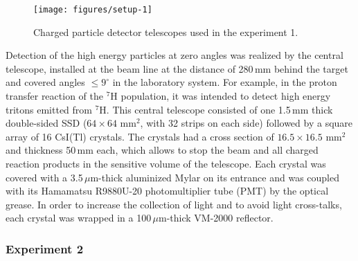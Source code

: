 \begin{figure}
	\begin{center}
		\texttt{[image: figures/setup-1]}
	\end{center}
	\caption{Charged particle detector telescopes used in the experiment 1.}
	\label{fig:setup-1}
\end{figure}

Detection of the high energy particles at zero angles was realized by the central telescope, installed at the beam line at the distance of 280\,mm behind the target and covered angles $\leq9^{\circ}$ in the laboratory system.
For example, in the proton transfer reaction of the $^7$H population, it was intended to detect high energy tritons emitted from $^7$H.
This central telescope consisted of one 1.5\,mm thick double-sided SSD ($64 \times 64$ mm$^2$, with 32 strips on each side) followed by a square array of 16 CsI(Tl) crystals.
The crystals had a cross section of $16.5\times16.5$ mm$^2$ and thickness 50\,mm each, which allows to stop the beam and all charged reaction products in the sensitive volume of the telescope.
Each crystal was covered with a 3.5\,$\mu$m-thick aluminized Mylar on its entrance and was coupled with its Hamamatsu R9880U-20 photomultiplier tube (PMT) by the optical grease.
In order to increase the collection of light and to avoid light cross-talks, each crystal was wrapped in a 100\,$\mu$m-thick VM-2000 reflector.


\subsubsection{Experiment 2}
\label{sec:exp-2}


